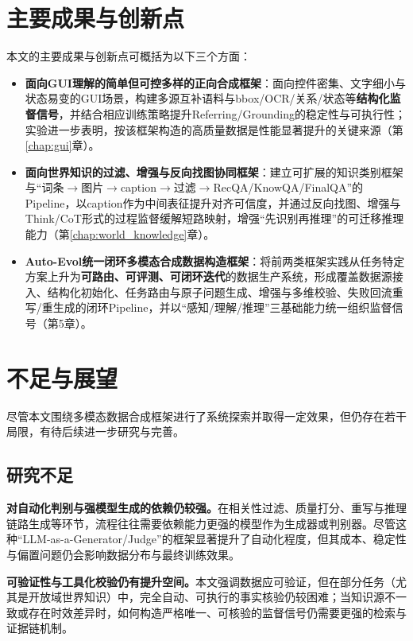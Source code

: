 \section{主要成果与创新点}
本文的主要成果与创新点可概括为以下三个方面：
\begin{itemize}
  \item \textbf{面向GUI理解的简单但可控多样的正向合成框架}：面向控件密集、文字细小与状态易变的GUI场景，构建多源互补语料与bbox/OCR/关系/状态等\textbf{结构化监督信号}，并结合相应训练策略提升Referring/Grounding的稳定性与可执行性；实验进一步表明，按该框架构造的高质量数据是性能显著提升的关键来源（第\ref{chap:gui}章）。
  \item \textbf{面向世界知识的过滤、增强与反向找图协同框架}：建立可扩展的知识类别框架与“词条$\rightarrow$图片$\rightarrow$caption$\rightarrow$过滤$\rightarrow$RecQA/KnowQA/FinalQA”的Pipeline，以caption作为中间表征提升对齐可信度，并通过反向找图、增强与Think/CoT形式的过程监督缓解短路映射，增强“先识别再推理”的可迁移推理能力（第\ref{chap:world_knowledge}章）。
  \item \textbf{Auto-Evol统一闭环多模态合成数据构造框架}：将前两类框架实践从任务特定方案上升为\textbf{可路由、可评测、可闭环迭代}的数据生产系统，形成覆盖数据源接入、结构化初始化、任务路由与原子问题生成、增强与多维校验、失败回流重写/重生成的闭环Pipeline，并以“感知/理解/推理”三基础能力统一组织监督信号（第5章）。
\end{itemize}

\section{不足与展望}
尽管本文围绕多模态数据合成框架进行了系统探索并取得一定效果，但仍存在若干局限，有待后续进一步研究与完善。

\subsection{研究不足}

\textbf{对自动化判别与强模型生成的依赖仍较强。}在相关性过滤、质量打分、重写与推理链路生成等环节，流程往往需要依赖能力更强的模型作为生成器或判别器。尽管这种“LLM-as-a-Generator/Judge”的框架显著提升了自动化程度，但其成本、稳定性与偏置问题仍会影响数据分布与最终训练效果。

\textbf{可验证性与工具化校验仍有提升空间。}本文强调数据应可验证，但在部分任务（尤其是开放域世界知识）中，完全自动、可执行的事实核验仍较困难；当知识源不一致或存在时效差异时，如何构造严格唯一、可核验的监督信号仍需要更强的检索与证据链机制。

